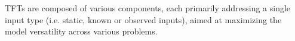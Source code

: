     
    \noindent TFTs are composed of various components, each primarily addressing a single input type (i.e. static, known or observed inputs), aimed at maximizing the model versatility across various problems.
    

